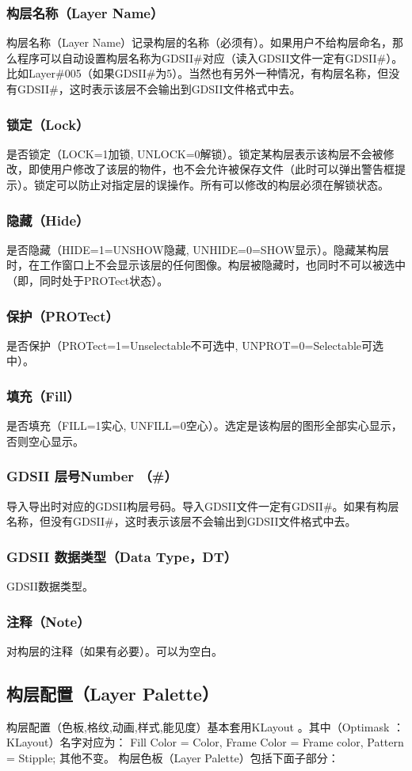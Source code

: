 \subsubsection{构层名称（Layer Name）}
构层名称（Layer Name）记录构层的名称（必须有）。如果用户不给构层命名，那么程序可以自动设置构层名称为GDSII\#对应（读入GDSII文件一定有GDSII\#）。 比如Layer\#005（如果GDSII\#为5）。当然也有另外一种情况，有构层名称，但没有GDSII\#，这时表示该层不会输出到GDSII文件格式中去。
\subsubsection{锁定（Lock）}
是否锁定（LOCK=1加锁, UNLOCK=0解锁）。锁定某构层表示该构层不会被修改，即使用户修改了该层的物件，也不会允许被保存文件（此时可以弹出警告框提示）。锁定可以防止对指定层的误操作。所有可以修改的构层必须在解锁状态。
\subsubsection{隐藏（Hide）}
是否隐藏（HIDE=1=UNSHOW隐藏, UNHIDE=0=SHOW显示）。隐藏某构层时，在工作窗口上不会显示该层的任何图像。构层被隐藏时，也同时不可以被选中（即，同时处于PROTect状态）。
\subsubsection{保护（PROTect）}
是否保护（PROTect=1=Unselectable不可选中, UNPROT=0=Selectable可选中）。
\subsubsection{填充（Fill）}
是否填充（FILL=1实心, UNFILL=0空心）。选定是该构层的图形全部实心显示，否则空心显示。
\subsubsection{GDSII 层号Number （\#）}
导入导出时对应的GDSII构层号码。导入GDSII文件一定有GDSII\#。如果有构层名称，但没有GDSII\#，这时表示该层不会输出到GDSII文件格式中去。
\subsubsection{GDSII 数据类型（Data Type，DT）}
GDSII数据类型。
\subsubsection{注释（Note）}
对构层的注释（如果有必要）。可以为空白。

\subsection{构层配置（Layer Palette）} \label{SectMaskLayerPalette} 
构层配置（色板,格纹,动画,样式,能见度）基本套用KLayout 。其中（Optimask ：KLayout）名字对应为： Fill Color = Color, Frame Color = Frame color, Pattern = Stipple; 其他不变。
构层色板（Layer Palette）包括下面子部分：
